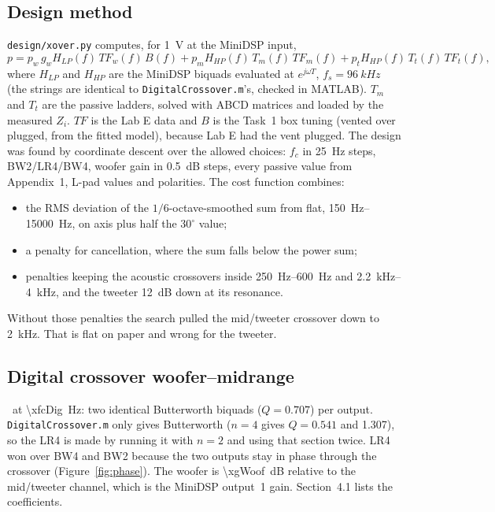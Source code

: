 \documentclass[a4paper,10pt]{article}
\newcommand{\file}[1]{\nolinkurl{#1}}
\begin{document}
\subsection{Design method}
\file{design/xover.py} computes, for \SI{1}{V} at the MiniDSP input,
\[
p = p_w\,g_w H_{LP}(f)\,TF_w(f)\,B(f) + p_m H_{HP}(f)\,T_m(f)\,TF_m(f) + p_t H_{HP}(f)\,T_t(f)\,TF_t(f),
\]
where $H_{LP}$ and $H_{HP}$ are the MiniDSP biquads evaluated at $e^{j\omega T}$, $f_s = \SI{96}{kHz}$
(the strings are identical to \file{DigitalCrossover.m}'s, checked in MATLAB). $T_m$ and $T_t$ are the
passive ladders, solved with ABCD matrices and loaded by the measured $Z_i$. $TF$ is the Lab E data and
$B$ is the Task~1 box tuning (vented over plugged, from the fitted model), because Lab E had the vent
plugged. The design was found by coordinate descent over the allowed choices: $f_c$ in \SI{25}{Hz}
steps, BW2/LR4/BW4, woofer gain in \SI{0.5}{dB} steps, every passive value from Appendix~1, L-pad
values and polarities. The cost function combines:
\begin{itemize}
\item the RMS deviation of the $1/6$-octave-smoothed sum from flat, \SIrange{150}{15000}{Hz}, on axis
  plus half the $30^\circ$ value;
\item a penalty for cancellation, where the sum falls below the power sum;
\item penalties keeping the acoustic crossovers inside \SIrange{250}{600}{Hz} and
  \SIrange{2.2}{4}{kHz}, and the tweeter \SI{12}{dB} down at its resonance.
\end{itemize}
Without those penalties the search pulled the mid/tweeter crossover down to \SI{2}{kHz}. That is flat
on paper and wrong for the tweeter.

\subsection{Digital crossover woofer--midrange}
\xalignDig\ at \SI{\xfcDig}{Hz}: two identical Butterworth biquads ($Q = 0.707$) per output.
\file{DigitalCrossover.m} only gives Butterworth ($n = 4$ gives $Q = 0.541$ and 1.307), so the LR4
is made by running it with $n = 2$ and using that section twice. LR4 won over BW4 and BW2 because
the two outputs stay in phase through the crossover (Figure~\ref{fig:phase}). The woofer is
\SI{\xgWoof}{dB} relative to the mid/tweeter channel, which is the MiniDSP output~1 gain. Section~4.1
lists the coefficients.
\end{document}
